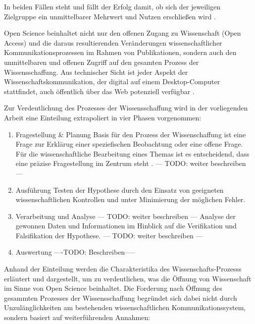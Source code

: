 In beiden Fällen steht und fällt der Erfolg damit, ob sich der jeweiligen Zielgruppe ein unmittelbarer Mehrwert und Nutzen erschließen wird \cite{schulze_2013_open}.

Open Science beinhaltet nicht nur den offenen Zugang zu Wissenschaft (Open Access) und die daraus resultierenden Veränderungen wissenschaftlicher Kommunikationsprozessen im Rahmen von Publikationen, sondern auch den unmittelbaren und offenen Zugriff auf den gesamten Prozess der Wissensschaffung. Aus technischer Sicht ist jeder Aspekt der Wissenschaftskommunikation, der digital auf einem Desktop-Computer stattfindet, auch öffentlich über das Web potenziell verfügbar \cite{mietchen2012wissenschaft}. 

Zur Verdeutlichung des Prozesses der Wissensschaffung wird in der vorliegenden Arbeit eine Einteilung extrapoliert in vier Phasen vorgenommen:
\begin{enumerate}
\item Fragestellung & Planung
Basis für den Prozess der Wissenschaffung ist eine Frage zur Erklärug einer speziefischen Beobachtung oder eine offene Frage\cite{suchen}. Für die wissenschaftliche Bearbeitung eines Themas ist es entscheidend, dass eine präzise Fragestellung im Zentrum steht \cite{suchen}. --- TODO: weiter beschreiben ---
\item Ausführung
Testen der Hypothese durch den Einsatz von geeigneten wissenschaftlichen Kontrollen und unter Minimierung der möglichen Fehler.
\item Verarbeitung und Analyse --- TODO: weiter beschreiben ---
Analyse der gewonnen Daten und Informationen im Hinblick auf die Verifikation und Falsifikation der Hypothese. --- TODO: weiter beschreiben ---
\item Auswertung
----TODO: Beschreiben-----
\end{enumerate}

Anhand der Einteilung werden die Charakteristika des Wissenschafts-Prozesss erläutert und dargestellt, um zu verdeutlichen, was die Öffnung von Wissenschaft im Sinne von Open Science beinhaltet. Die Forderung nach Öffnung des gesammten Prozesses der Wissensschaffung begründet sich dabei nicht durch Unzulänglichkeiten am bestehenden wissenschaftlichen Kommunikationssystem, sondern basiert auf weiterführenden Annahmen:


